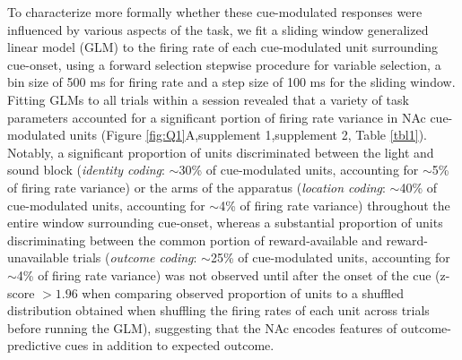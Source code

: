 \documentclass[11pt]{article}
\begin{document}
To characterize more formally whether these cue-modulated responses were influenced by various aspects of the task, we fit a sliding window generalized linear model (GLM) to the firing rate of each cue-modulated unit surrounding cue-onset, using a forward selection stepwise procedure for variable selection, a bin size of 500 ms for firing rate and a step size of 100 ms for the sliding window. Fitting GLMs to all trials within a session revealed that a variety of task parameters accounted for a significant portion of firing rate variance in NAc cue-modulated units (Figure \ref{fig:Q1}A,supplement 1,supplement 2, Table \ref{tbl1}). Notably, a significant proportion of units discriminated between the light and sound block ({\it identity coding}: $\sim$30\% of cue-modulated units, accounting for $\sim$5\% of firing rate variance) or the arms of the apparatus ({\it location coding}: $\sim$40\% of cue-modulated units, accounting for $\sim$4\% of firing rate variance) throughout the entire window surrounding cue-onset, whereas a substantial proportion of units discriminating between the common portion of reward-available and reward-unavailable trials ({\it outcome coding}: $\sim$25\% of cue-modulated units, accounting for $\sim$4\% of firing rate variance) was not observed until after the onset of the cue (z-score $>1.96$ when comparing observed proportion of units to a shuffled distribution obtained when shuffling the firing rates of each unit across trials before running the GLM), suggesting that the NAc encodes features of outcome-predictive cues in addition to expected outcome. 
\end{document}
